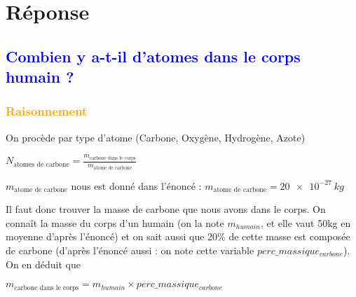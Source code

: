 \documentclass[a4paper,12pt]{article}
\begin{document}
\section*{Réponse}

\subsection{\textcolor{blue}{Combien y a-t-il d'atomes dans le corps humain ?}}

\subsubsection*{\textcolor{orange}{Raisonnement}}

\vspace{1em} 
On procède par type d'atome (Carbone, Oxygène, Hydrogène, Azote) \par
\vspace{1em} 
$N_{\text{atomes de carbone}} = \frac{m_{\text{carbone dans le corps}}}{m_{\text{atome de carbone}}}$ \par
\vspace{1em} 
$m_{\text{atome de carbone}}$ nous est donné dans l'énoncé : $m_{\text{atome de carbone}} = \SI{20e-27}{kg}$ \par 
\vspace{1em} 
Il faut donc trouver la masse de carbone que nous avons dans le corps. On connaît la masse du corps d'un humain (on la note $m_{humain}$, et elle vaut 50kg en moyenne d'après l'énoncé) et on sait aussi que 20\% de cette masse est composée de carbone (d'après l'énoncé aussi : on note cette variable $perc\_massique_{carbone}$). On en déduit que \par
\vspace{1em} 
$m_{\text{carbone dans le corps}} = m_{humain} \times perc\_massique_{carbone}$
\end{document}
